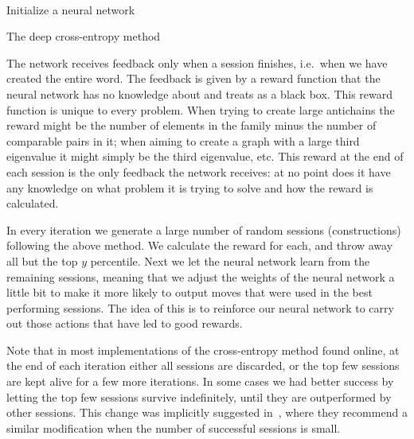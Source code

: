 \documentclass[11pt,english]{article}
\theoremstyle{plain}
\theoremstyle{remark}
\begin{document}
~

\begin{algorithm}[H]
\SetAlgoLined
 Initialize a neural network\;
 \caption{The deep cross-entropy method}
\end{algorithm}

The network receives feedback only when a session finishes, i.e.~when we have created the entire word. The feedback is given by a reward function that the neural network has no knowledge about and treats as a black box. This reward function is unique to every problem. When trying to create large antichains the reward might be the number of elements in the family minus the number of comparable pairs in it; when aiming to create a graph with a large third eigenvalue it might simply be the third eigenvalue, etc. This reward at the end of each session is the only feedback the network receives: at no point does it have any knowledge on what problem it is trying to solve and how the reward is calculated. 

In every iteration we generate a large number of random sessions (constructions) following the above method. We calculate the reward for each, and throw away all but the top $y$ percentile. Next we let the neural network learn from the remaining sessions, meaning that we adjust the weights of the neural network a little bit to make it more likely to output moves that were used in the best performing sessions. The idea of this is to reinforce our neural network to carry out those actions that have led to good rewards.  

Note that in most implementations of the cross-entropy method found online, at the end of each iteration either all sessions are discarded, or the top few sessions are kept alive for a few more iterations. In some cases we had better success by letting the top few sessions survive indefinitely, until they are outperformed by other sessions. This change was implicitly suggested in~\cite{tds}, where they recommend a similar modification when the number of successful sessions is small.
\end{document}
